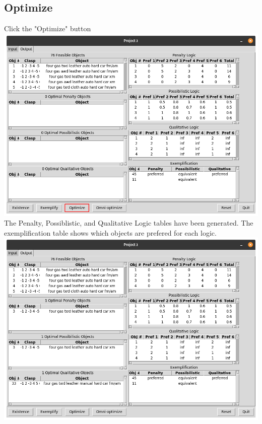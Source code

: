 \documentclass[titlepage]{article}
\begin{document}
\subsection{Optimize} Click the "Optimize" button\\
\includegraphics[scale=0.3]{optimize}\\
The Penalty, Possiblistic, and Qualitative Logic tables have been generated. The exemplification table shows which objects are prefered for each logic.\\
\includegraphics[scale=0.3]{post_optimize}
\newpage
\end{document}
